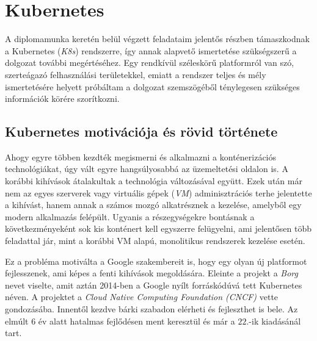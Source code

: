 \chapter{Kubernetes}
\label{sec:Kubernetes}
A diplomamunka keretén belül végzett feladataim jelentős részben támaszkodnak a Kubernetes (\textit{K8s}) rendszerre, így annak alapvető ismertetése szükségszerű a dolgozat további megértéséhez.
Egy rendkívül széleskörű platformról van szó, szerteágazó felhasználási területekkel, emiatt a rendszer teljes és mély ismertetésére helyett próbáltam a dolgozat szemszögéből ténylegesen szükséges információk körére szorítkozni.

\section{Kubernetes motivációja és rövid története}
Ahogy egyre többen kezdték megismerni és alkalmazni a konténerizációs technológiákat, úgy vált egyre hangsúlyosabbá az üzemeltetési oldalon is.
A korábbi kihívások átalakultak a technológia változásával együtt. 
Ezek után már nem az egyes szerverek vagy virtuális gépek (\textit{VM}) adminisztrációs terhe jelentette a kihívást, hanem annak a számos mozgó alkatrésznek a kezelése, amelyből egy modern alkalmazás felépült.
Ugyanis a részegységekre bontásnak a következményeként sok kis konténert kell egyszerre felügyelni, ami jelentősen több feladattal jár, mint a korábbi VM alapú, monolitikus rendszerek kezelése esetén.

Ez a probléma motiválta a Google szakembereit is, hogy egy olyan új platformot fejlesszenek, ami képes a fenti kihívások megoldására.
Eleinte a projekt a \textit{Borg}\citep{Borg} nevet viselte, amit aztán 2014-ben a Google nyílt forráskódúvá tett Kubernetes néven.
A projektet a \textit{Cloud Native Computing Foundation (\textit{CNCF})}\citep{cncf} vette gondozásába.
Innentől kezdve bárki szabadon elérheti és fejleszthet is bele.
Az elmúlt 6 év alatt hatalmas fejlődésen ment keresztül és már a $22$.-ik kiadásánál tart.

